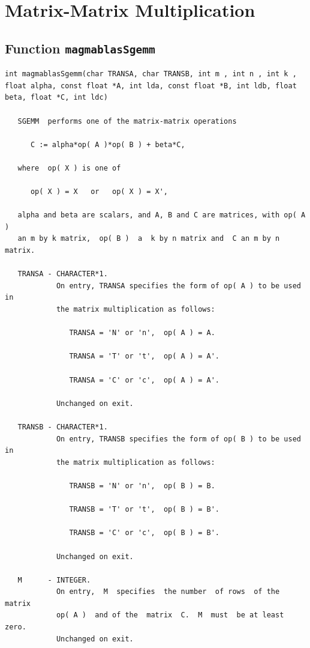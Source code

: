 \documentclass[10pt]{book}
\begin{document}
\newpage
\section{Matrix-Matrix Multiplication}
\newpage
\subsection{Function {\tt {\bf magmablasSgemm}}}

\begin{verbatim}
int magmablasSgemm(char TRANSA, char TRANSB, int m , int n , int k , float alpha, const float *A, int lda, const float *B, int ldb, float beta, float *C, int ldc)

   SGEMM  performs one of the matrix-matrix operations
 
      C := alpha*op( A )*op( B ) + beta*C,
 
   where  op( X ) is one of
 
      op( X ) = X   or   op( X ) = X',
 
   alpha and beta are scalars, and A, B and C are matrices, with op( A )
   an m by k matrix,  op( B )  a  k by n matrix and  C an m by n matrix.
 
   TRANSA - CHARACTER*1.
            On entry, TRANSA specifies the form of op( A ) to be used in
            the matrix multiplication as follows:
 
               TRANSA = 'N' or 'n',  op( A ) = A.
 
               TRANSA = 'T' or 't',  op( A ) = A'.
 
               TRANSA = 'C' or 'c',  op( A ) = A'.
 
            Unchanged on exit.
 
   TRANSB - CHARACTER*1.
            On entry, TRANSB specifies the form of op( B ) to be used in
            the matrix multiplication as follows:
 
               TRANSB = 'N' or 'n',  op( B ) = B.
 
               TRANSB = 'T' or 't',  op( B ) = B'.
 
               TRANSB = 'C' or 'c',  op( B ) = B'.
 
            Unchanged on exit.
 
   M      - INTEGER.
            On entry,  M  specifies  the number  of rows  of the  matrix
            op( A )  and of the  matrix  C.  M  must  be at least  zero.
            Unchanged on exit.
 

\end{verbatim}
\end{document}
